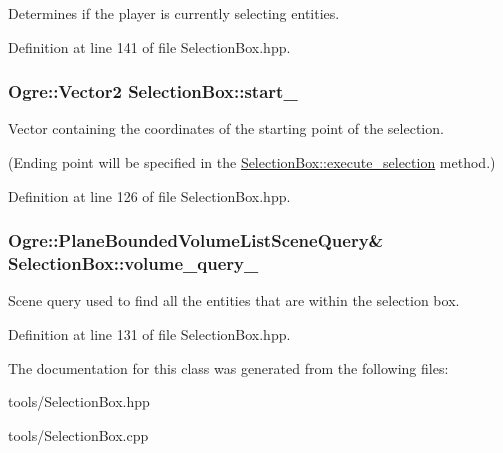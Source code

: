 Determines if the player is currently selecting entities. 



Definition at line 141 of file Selection\+Box.\+hpp.

\subsubsection[{\texorpdfstring{start\+\_\+}{start_}}]{\setlength{\rightskip}{0pt plus 5cm}Ogre\+::\+Vector2 Selection\+Box\+::start\+\_\+\hspace{0.3cm}{\ttfamily [private]}}\hypertarget{class_selection_box_a972855bf908b9a6a5048b3fb842dc769}{}\label{class_selection_box_a972855bf908b9a6a5048b3fb842dc769}


Vector containing the coordinates of the starting point of the selection. 

(Ending point will be specified in the \hyperlink{class_selection_box_a8013255ab23d92e60bb28378e837421a}{Selection\+Box\+::execute\+\_\+selection} method.) 

Definition at line 126 of file Selection\+Box.\+hpp.

\subsubsection[{\texorpdfstring{volume\+\_\+query\+\_\+}{volume_query_}}]{\setlength{\rightskip}{0pt plus 5cm}Ogre\+::\+Plane\+Bounded\+Volume\+List\+Scene\+Query\& Selection\+Box\+::volume\+\_\+query\+\_\+\hspace{0.3cm}{\ttfamily [private]}}\hypertarget{class_selection_box_a2218879b200ef6b963ea834d38010831}{}\label{class_selection_box_a2218879b200ef6b963ea834d38010831}


Scene query used to find all the entities that are within the selection box. 



Definition at line 131 of file Selection\+Box.\+hpp.



The documentation for this class was generated from the following files\+:\begin{DoxyCompactItemize}
\item 
tools/Selection\+Box.\+hpp\item 
tools/Selection\+Box.\+cpp\end{DoxyCompactItemize}
